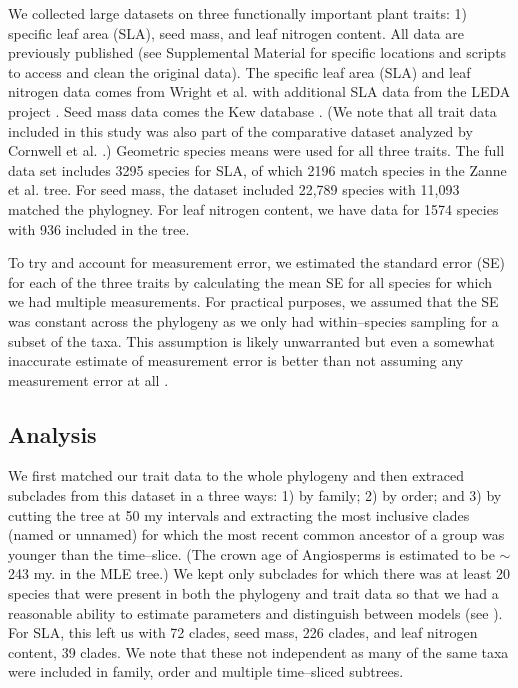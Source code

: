 \documentclass[a4paper,12pt]{article}
\begin{document}
We collected large datasets on three functionally important plant traits: 1) specific leaf area (SLA), seed mass, and leaf nitrogen content. All data are previously published (see Supplemental Material for specific locations and scripts to access and clean the original data). The specific leaf area (SLA) and leaf nitrogen data comes from Wright et al. \citep{Wright2004} with additional SLA data from the LEDA project \citep{Kleyer2008}. Seed mass data comes the Kew database \citep{Kew2008}. (We note that all trait data included in this study was also part of the comparative dataset analyzed by Cornwell et al. \citep{ksi}.) Geometric species means were used for all three traits. 
The full data set includes 3295 species for SLA, of which 2196 match species in the Zanne et al. tree. For seed mass, the dataset included 22,789 species with 11,093 matched the phylogney. For leaf nitrogen content, we have data for 1574 species with 936 included in the tree.

To try and account for measurement error, we estimated the standard error (SE) for each of the three traits by calculating the mean SE for all species for which we had multiple measurements. For practical purposes, we assumed that the SE was constant across the phylogeny as we only had within--species sampling for a subset of the taxa. This assumption is likely unwarranted but even a somewhat inaccurate estimate of measurement error is better than not assuming any measurement error at all \citep{Hansen2012}.

\subsection{Analysis}

We first matched our trait data to the whole phylogeny and then extraced subclades from this dataset in a three ways: 1) by family; 2) by order; and 3) by cutting the tree at 50 my intervals and extracting the most inclusive clades (named or unnamed) for which the most recent common ancestor of a group was younger than the time--slice. 
(The crown age of Angiosperms is estimated to be $\sim$243 my. in the MLE tree.) We kept only subclades for which there was at least 20 species that were present in both the phylogeny and trait data so that we had a reasonable ability to estimate parameters and distinguish between models (see \citep{Boettiger2012, SlaterPennell}). 
For SLA, this left us with 72 clades, seed mass, 226 clades, and leaf nitrogen content, 39 clades. We note that these not independent as many of the same taxa were included in family, order and multiple time--sliced subtrees. 
\end{document}

